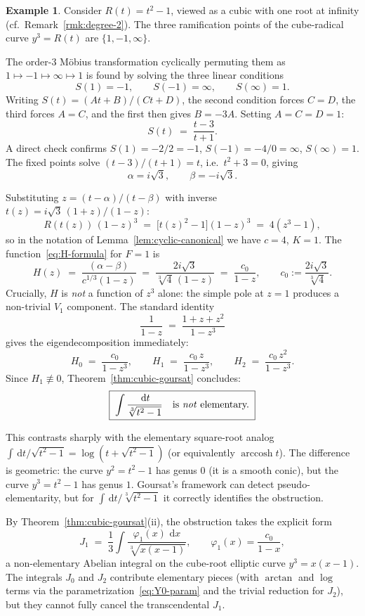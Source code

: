 \documentclass[11pt,a4paper]{article}
\theoremstyle{plain}
\theoremstyle{definition}
\newtheorem{example}[theorem]{Example}
\theoremstyle{remark}
\renewcommand{\d}{\,\mathrm{d}}
\begin{document}
\begin{example}
Consider $R(t)=t^2-1$, viewed as a cubic with one root at infinity (cf.\ Remark~\ref{rmk:degree-2}). The three ramification points of the cube-radical curve $y^3 = R(t)$ are $\{1,-1,\infty\}$.

The order-$3$ M\"obius transformation cyclically permuting them as $1 \mapsto -1 \mapsto \infty \mapsto 1$ is found by solving the three linear conditions
\[
  S(1) = -1,\qquad S(-1) = \infty,\qquad S(\infty) = 1.
\]
Writing $S(t) = (At+B)/(Ct+D)$, the second condition forces $C = D$, the third forces $A = C$, and the first then gives $B = -3A$. Setting $A=C=D=1$:
\[
  S(t) \;=\; \frac{t-3}{t+1}.
\]
A direct check confirms $S(1) = -2/2 = -1$, $S(-1) = -4/0 = \infty$, $S(\infty) = 1$. The fixed points solve $(t-3)/(t+1) = t$, i.e.\ $t^2 + 3 = 0$, giving
\[
  \alpha = i\sqrt{3},\qquad \beta = -i\sqrt{3}.
\]

Substituting $z = (t-\alpha)/(t-\beta)$ with inverse $t(z) = i\sqrt{3}\,(1+z)/(1-z)$:
\[
  R(t(z))\,(1-z)^3 \;=\; \bigl[t(z)^2-1\bigr](1-z)^3 \;=\; 4(z^3-1),
\]
so in the notation of Lemma~\ref{lem:cyclic-canonical} we have $c=4$, $K=1$. The function~\eqref{eq:H-formula} for $F=1$ is
\[
  H(z) \;=\; \frac{(\alpha-\beta)}{c^{1/3}(1-z)} \;=\; \frac{2i\sqrt{3}}{\sqrt[3]{4}\,(1-z)} \;=\; \frac{c_0}{1-z},\qquad c_0 := \frac{2i\sqrt{3}}{\sqrt[3]{4}}.
\]
Crucially, $H$ is \emph{not} a function of $z^3$ alone: the simple pole at $z=1$ produces a non-trivial $V_1$ component. The standard identity
\[
  \frac{1}{1-z} \;=\; \frac{1+z+z^2}{1-z^3}
\]
gives the eigendecomposition immediately:
\[
  H_0 \;=\; \frac{c_0}{1-z^3},\qquad H_1 \;=\; \frac{c_0\,z}{1-z^3},\qquad H_2 \;=\; \frac{c_0\,z^2}{1-z^3}.
\]
Since $H_1 \not\equiv 0$, Theorem~\ref{thm:cubic-goursat} concludes:
\begin{equation*}
  \boxed{\;\int \frac{\d t}{\sqrt[3]{t^2-1}} \quad\text{is \emph{not} elementary.}\;}
\end{equation*}

This contrasts sharply with the elementary square-root analog $\int \d t/\sqrt{t^2-1} = \log(t+\sqrt{t^2-1})$ (or equivalently $\operatorname{arccosh} t$). The difference is geometric: the curve $y^2 = t^2-1$ has genus $0$ (it is a smooth conic), but the curve $y^3 = t^2-1$ has genus $1$. Goursat's framework can detect pseudo-elementarity, but for $\int \d t/\sqrt[3]{t^2-1}$ it correctly identifies the obstruction.

By Theorem~\ref{thm:cubic-goursat}(ii), the obstruction takes the explicit form
\[
  J_1 \;=\; \frac{1}{3}\int \frac{\varphi_1(x)\,\d x}{\sqrt[3]{x(x-1)}},\qquad \varphi_1(x) = \frac{c_0}{1-x},
\]
a non-elementary Abelian integral on the cube-root elliptic curve $y^3=x(x-1)$. The integrals $J_0$ and $J_2$ contribute elementary pieces (with $\arctan$ and $\log$ terms via the parametrization~\eqref{eq:Y0-param} and the trivial reduction for $J_2$), but they cannot fully cancel the transcendental $J_1$.


\end{example}
\end{document}
